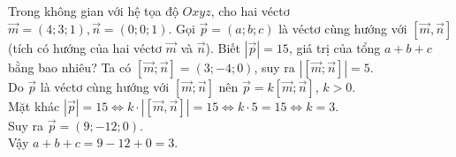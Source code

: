\begin{ex}%
	Trong không gian với hệ tọa độ $O x y z$, cho hai véctơ $\overrightarrow{m}=(4; 3; 1), \overrightarrow{n}=(0; 0; 1)$. Gọi $\overrightarrow{p}=\left(a;b;c\right)$ là véctơ cùng hướng với $[\overrightarrow{m}, \overrightarrow{n}]$ (tích có hướng của hai véctơ $\overrightarrow{m}$ và $\overrightarrow{n}$). Biết $|\overrightarrow{p}|=15$, giá trị của tổng $a+b+c$ bằng bao nhiêu?
	\loigiai
	{
	Ta có  $[\overrightarrow{m}; \overrightarrow{n}]=(3;-4; 0)$, suy ra $|[\overrightarrow{m}; \overrightarrow{n}]|=5$.\\
	Do $\overrightarrow{p}$ là véctơ cùng hướng với $[\overrightarrow{m}; \overrightarrow{n}]$ nên $\overrightarrow{p}=k[\overrightarrow{m}; \overrightarrow{n}]$, $k>0$.\\
	Mặt khác $|\overrightarrow{p}|=15 \Leftrightarrow k \cdot|[\overrightarrow{m}, \overrightarrow{n}]| =15 \Leftrightarrow k\cdot 5=15 \Leftrightarrow k=3$.\\
	Suy ra $\overrightarrow{p}=(9;-12; 0)$.	\\
	Vậy $a+b+c=9-12+0=3$.
	}
\end{ex}
